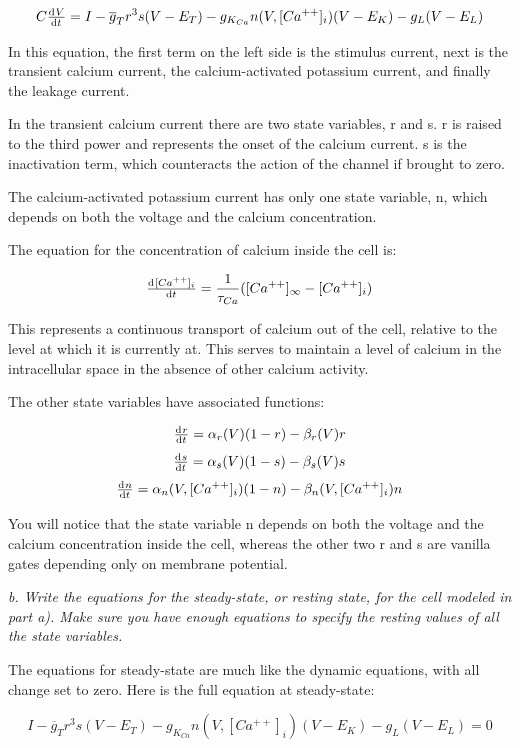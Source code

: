 \documentclass[12pt]{article}
\begin{document}
$$ C\od{V}{t}=I-\overline{g}_Tr^3s(V-E_T)-g_{K_{Ca}}n(V,[Ca^{++}]_i)(V-E_K)-g_L(V-E_L) $$

In this equation, the first term on the left side is the stimulus current, next is the transient calcium current, the calcium-activated potassium current, and finally the leakage current.  

In the transient calcium current there are two state variables, r and s.  r is raised to the third power and represents the onset of the calcium current.  s is the inactivation term, which counteracts the action of the channel if brought to zero.

The calcium-activated potassium current has only one state variable, n, which depends on both the voltage and the calcium concentration.  

The equation for the concentration of calcium inside the cell is:

$$ \od{[Ca^{++}]_i}{t}=\frac{1}{\tau_{Ca}}([Ca^{++}]_{\infty}-[Ca^{++}]_i) $$

This represents a continuous transport of calcium out of the cell, relative to the level at which it is currently at.  This serves to maintain a level of calcium in the intracellular space in the absence of other calcium activity.  

The other state variables have associated functions:

$$ \od{r}{t}=\alpha_r(V)(1-r)-\beta_r(V)r $$
$$ \od{s}{t}=\alpha_s(V)(1-s)-\beta_s(V)s $$
$$ \od{n}{t}=\alpha_n(V,[Ca^{++}]_i)(1-n)-\beta_n(V,[Ca^{++}]_i)n $$

You will notice that the state variable n depends on both the voltage and the calcium concentration inside the cell, whereas the other two r and s are vanilla gates depending only on membrane potential.

\vspace{10pt}

\emph{b.  Write the equations for the steady-state, or resting state, for the cell modeled in part a). Make sure you have enough equations to specify the resting values of all the state variables.}

\vspace{10pt}

The equations for steady-state are much like the dynamic equations, with all change set to zero.  Here is the full equation at steady-state:

$$ I-\overline{g}_Tr^3s(V-E_T)-g_{K_{Ca}}n(V,[Ca^{++}]_i)(V-E_K)-g_L(V-E_L)=0 $$
\end{document}
